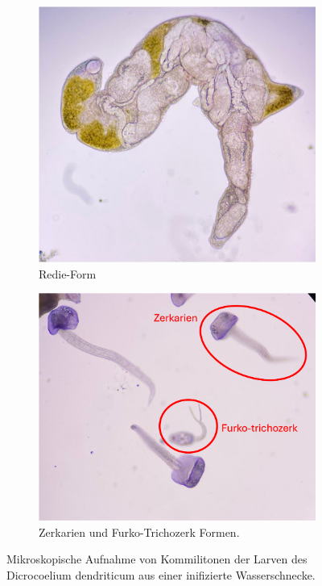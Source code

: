 \documentclass[oneside,10pt,a4paper]{report}
\begin{document}
					\begin{figure}[H]
					\centering
					\begin{subfigure}[b]{0.4\textwidth}
						\includegraphics[width=\textwidth]{Redie.jpg}
						\caption{Redie-Form}
						\label{fig:Redie}
					\end{subfigure}
					\hfill
					\begin{subfigure}[b]{0.45\textwidth}
						\includegraphics[width=\textwidth]{Zerkarien.png}
						\caption{Zerkarien und Furko-Trichozerk Formen.}
						\label{fig: Zerkarien}
					\end{subfigure}
					\caption{Mikroskopische Aufnahme von Kommilitonen der Larven des  Dicrocoelium dendriticum aus einer inifizierte Wasserschnecke.}
					\label{fig: Trematodenlarven}
				\end{figure}
				
\end{document}
